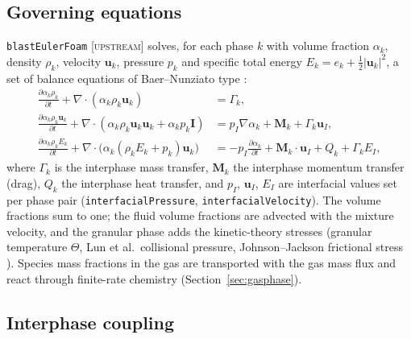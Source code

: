 \documentclass{article}
\newcommand{\up}{\textsc{[upstream]}}
\begin{document}
\subsection{Governing equations}
\label{sec:equations}

\texttt{blastEulerFoam} \up{} solves, for each phase $k$ with volume fraction $\alpha_k$, density $\rho_k$, velocity $\mathbf{u}_k$, pressure $p_k$ and specific total energy $E_k = e_k + \tfrac12|\mathbf{u}_k|^2$, a set of balance equations of Baer--Nunziato type \cite{baer1986,saurel1999}:
\begin{align}
    \frac{\partial \alpha_k\rho_k}{\partial t} + \nabla\cdot(\alpha_k\rho_k\mathbf{u}_k) &= \Gamma_k, \\
    \frac{\partial \alpha_k\rho_k\mathbf{u}_k}{\partial t} + \nabla\cdot(\alpha_k\rho_k\mathbf{u}_k\mathbf{u}_k + \alpha_k p_k \mathbf{I}) &= p_I\nabla\alpha_k + \mathbf{M}_k + \Gamma_k\mathbf{u}_I, \\
    \frac{\partial \alpha_k\rho_k E_k}{\partial t} + \nabla\cdot\big(\alpha_k(\rho_k E_k + p_k)\mathbf{u}_k\big) &= -p_I\frac{\partial\alpha_k}{\partial t} + \mathbf{M}_k\cdot\mathbf{u}_I + Q_k + \Gamma_k E_I,
\end{align}
where $\Gamma_k$ is the interphase mass transfer, $\mathbf{M}_k$ the interphase momentum transfer (drag), $Q_k$ the interphase heat transfer, and $p_I$, $\mathbf{u}_I$, $E_I$ are interfacial values set per phase pair (\texttt{interfacialPressure}, \texttt{interfacialVelocity}). The volume fractions sum to one; the fluid volume fractions are advected with the mixture velocity, and the granular phase adds the kinetic-theory stresses (granular temperature $\Theta$, Lun et al.\ collisional pressure, Johnson--Jackson frictional stress \cite{gidaspow}). Species mass fractions in the gas are transported with the gas mass flux and react through finite-rate chemistry (Section~\ref{sec:gasphase}).

\subsection{Interphase coupling}
\label{sec:coupling}
\end{document}
